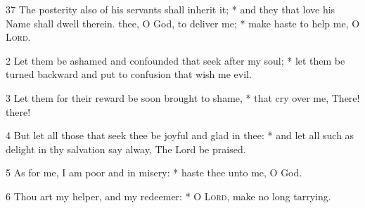 37 The posterity also of his servants shall inherit it; * and they that love his Name shall dwell therein.
 thee, O God, to deliver me; * make haste to help me, O {\textsc{Lord}}.\par
2 Let them be ashamed and confounded that seek after my soul; * let them be turned backward and put to confusion that wish me evil.\par
3 Let them for their reward be soon brought to shame, * that cry over me, There! there!\par
4 But let all those that seek thee be joyful and glad in thee: * and let all such as delight in thy salvation say alway, The Lord be praised.\par
5 As for me, I am poor and in misery: * haste thee unto me, O God.\par
6 Thou art my helper, and my redeemer: * O {\textsc{Lord}}, make no long tarrying.
